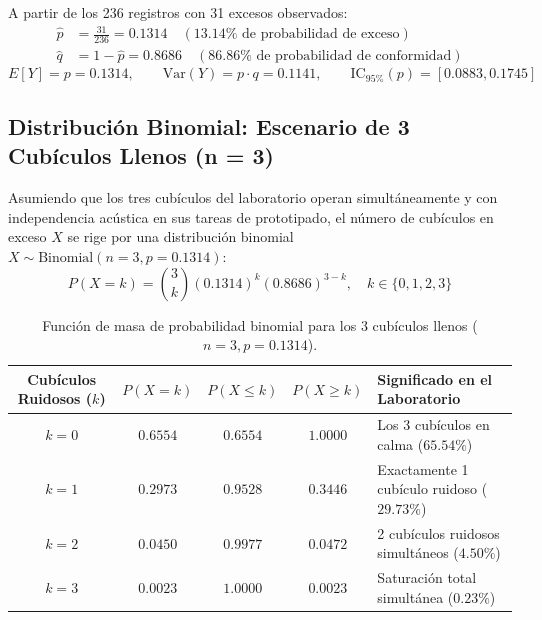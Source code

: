 \documentclass{article}
\begin{document}
A partir de los 236 registros con 31 excesos observados:
\begin{align}
    \hat{p} &= \frac{31}{236} = \mathbf{0.1314} \quad (13.14\% \text{ de probabilidad de exceso}) \\
    \hat{q} &= 1 - \hat{p} = \mathbf{0.8686} \quad (86.86\% \text{ de probabilidad de conformidad})
\end{align}
\begin{equation}
    E[Y] = p = 0.1314, \qquad \text{Var}(Y) = p \cdot q = 0.1141, \qquad \text{IC}_{95\%}(p) = [0.0883, 0.1745]
\end{equation}

\subsection{Distribución Binomial: Escenario de 3 Cubículos Llenos (n = 3)}
Asumiendo que los tres cubículos del laboratorio operan simultáneamente y con independencia acústica en sus tareas de prototipado, el número de cubículos en exceso $X$ se rige por una distribución binomial $X \sim \text{Binomial}(n=3, p=0.1314)$:
\begin{equation}
    P(X = k) = \binom{3}{k} (0.1314)^k (0.8686)^{3-k}, \quad k \in \{0, 1, 2, 3\}
\end{equation}

\begin{table}[H]
\centering
\caption{Función de masa de probabilidad binomial para los 3 cubículos llenos ($n=3, p=0.1314$).}
\label{tab:binomial}
\vspace{0.2cm}
\begin{tabular}{c c c c l}
\toprule
\textbf{Cubículos Ruidosos ($k$)} & $P(X = k)$ & $P(X \le k)$ & $P(X \ge k)$ & \textbf{Significado en el Laboratorio} \\
\midrule
$k = 0$ & $0.6554$ & $0.6554$ & $1.0000$ & Los 3 cubículos en calma ($65.54\%$) \\
$k = 1$ & $0.2973$ & $0.9528$ & $0.3446$ & Exactamente 1 cubículo ruidoso ($29.73\%$) \\
$k = 2$ & $0.0450$ & $0.9977$ & $0.0472$ & 2 cubículos ruidosos simultáneos ($4.50\%$) \\
$k = 3$ & $0.0023$ & $1.0000$ & $0.0023$ & Saturación total simultánea ($0.23\%$) \\
\bottomrule
\end{tabular}
\end{table}
\end{document}
